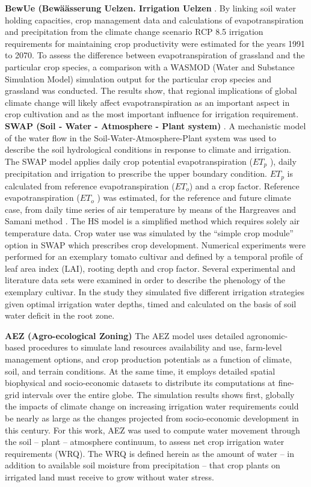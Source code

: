 \documentclass[letterpaper, 10 pt, conference]{ieeeconf}  %
\begin{document}
\textbf{BewUe (Bew\"aässerung Uelzen. Irrigation Uelzen} \cite{riediger2016modelling}. By linking soil water holding capacities, crop management data and calculations of evapotranspiration and precipitation from the climate change scenario RCP 8.5 irrigation requirements for maintaining crop productivity were estimated for the years 1991 to 2070. To assess the difference between evapotranspiration of grassland and the particular crop species, a comparison with a WASMOD (Water and Substance Simulation Model) simulation output for the particular crop species and grassland was conducted. The results show, that regional implications of global climate change will likely affect evapotranspiration as an important aspect in crop cultivation and as the most important influence for irrigation requirement.\\ 

\textbf{SWAP (Soil - Water - Atmosphere - Plant system)} \cite{de2017adaptability}. A mechanistic model of the water flow in the Soil-Water-Atmosphere-Plant system  was used to describe the soil hydrological conditions in response to climate and irrigation. The SWAP model applies daily crop potential evapotranspiration ($ET_p$ ), daily precipitation and irrigation to prescribe the upper boundary condition. $ET_p$ is calculated from reference evapotranspiration ($ET_o$) and a crop factor. Reference evapotranspiration ($ET_o$ ) was estimated, for the reference and future climate case, from daily time series of air temperature by means of the Hargreaves and Samani method \cite{hargreaves1985reference}. The HS model is a simplified method which requires solely air temperature data. Crop water use was simulated by the “simple crop module” option in SWAP which prescribes crop development. Numerical experiments were performed for an exemplary tomato cultivar and defined by a temporal profile of leaf area index (LAI), rooting depth and crop factor. Several experimental and literature data sets were examined in order to describe the phenology of the exemplary cultivar. In the study they simulated five different irrigation strategies given optimal irrigation water depths, timed and calculated on the basis of soil water deficit in the root zone.

\textbf{AEZ (Agro-ecological Zoning)} \cite{fischer2007climate} The AEZ model uses detailed agronomic-based procedures to simulate land resources availability and use, farm-level management options, and crop production potentials as a function of climate, soil, and terrain conditions. At the same time, it employs detailed spatial biophysical and socio-economic datasets to distribute its computations at fine-grid intervals over the entire globe.  The simulation results shows first, globally the impacts of climate change on increasing irrigation water requirements could be nearly as large as the changes projected from socio-economic development in this century. For this work, AEZ was used to compute water movement through the soil – plant – atmosphere continuum, to assess net crop irrigation water requirements (WRQ). The WRQ is defined herein as the amount of water – in addition to available soil moisture from precipitation – that crop plants on irrigated land must receive to grow without water stress. 
\end{document}
